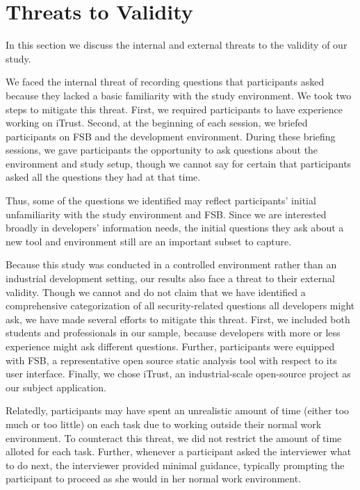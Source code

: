 \documentclass{sig-alternate}
\begin{document}
\section{Threats to Validity}
\label{limits}
In this section we discuss the internal and external threats to the validity of our study.

We faced the internal threat of recording questions that participants asked because they lacked a basic familiarity with the study environment. 
We took two steps to mitigate this threat.
First, we required participants to have experience working on iTrust.
Second, at the  beginning of each session, we briefed participants on FSB and the development environment. 
During these briefing sessions, we gave participants the opportunity to ask questions about the environment and study setup, though we cannot say for certain that participants asked all the questions they had at that time.

Thus, some of the questions we identified may reflect participants' initial unfamiliarity with the study environment and FSB.
Since we are interested broadly in developers' information needs, the initial questions they ask about a new tool and environment still are an important subset to capture.

Because this study was conducted in a controlled environment rather than an industrial development setting, our results also face a threat to their external validity. 
Though we cannot and do not claim that we have identified a comprehensive categorization of all security-related questions all developers might ask, we have made several efforts to mitigate this threat.
First, we included both students and professionals in our sample, because developers with more or less experience might ask different questions. 
Further, participants were equipped with FSB, a representative open source static analysis tool with respect to its user interface.
Finally, we chose iTrust, an industrial-scale open-source project as our subject application.

Relatedly, participants may have spent an unrealistic amount of time (either too much or too little) on each task due to working outside their normal work environment.
To counteract this threat, we did not restrict the amount of time alloted for each task.
Further, whenever a participant asked the interviewer what to do next, the interviewer provided minimal guidance, typically prompting the participant to proceed as she would in her normal work environment.
\end{document}
